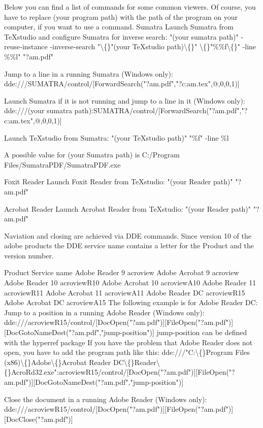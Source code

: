 \documentclass{article}
\begin{document}
	Below you can find a list of commands for some common viewers. Of course, you have to replace (your program path) with the path of the program on your computer, if you want to use a command.
	Sumatra
	Launch Sumatra from TeXstudio and configure Sumatra for inverse search: "(your sumatra path)" -reuse-instance -inverse-search "\textbackslash\{\}"(your TeXstudio path)\textbackslash\{\}" \textbackslash\{\}"\%\%f\textbackslash\{\}" -line \%\%l" "?am.pdf"
	
	Jump to a line in a running Sumatra (Windows only): dde:///SUMATRA/control/[ForwardSearch("?am.pdf","?c:am.tex",@,0,0,1)]
	
	Launch Sumatra if it is not running and jump to a line in it (Windows only): dde:///(your sumatra path):SUMATRA/control/[ForwardSearch("?am.pdf","?c:am.tex",@,0,0,1)]
	
	Launch TeXstudio from Sumatra: "(your TeXstudio path)" "\%f" -line \%l
	
	A possible value for (your Sumatra path) is C:/Program Files/SumatraPDF/SumatraPDF.exe
	
	Foxit Reader
	Launch Foxit Reader from TeXstudio: "(your Reader path)" "?am.pdf"
	
	Acrobat Reader
	Launch Acrobat Reader from TeXstudio: "(your Reader path)" "?am.pdf"
	
	Naviation and closing are achieved via DDE commands. Since version 10 of the adobe products the DDE service name contains a letter for the Product and the version number.
	
	Product	Service name
	Adobe Reader 9	acroview
	Adobe Acrobat 9	acroview
	Adobe Reader 10	acroviewR10
	Adobe Acrobat 10	acroviewA10
	Adobe Reader 11	acroviewR11
	Adobe Acrobat 11	acroviewA11
	Adobe Reader DC	acroviewR15
	Adobe Acrobat DC	acroviewA15
	The following example is for Adobe Reader DC:
	Jump to a position in a running Adobe Reader (Windows only): dde:///acroviewR15/control/[DocOpen("?am.pdf")][FileOpen("?am.pdf")][DocGotoNameDest("?am.pdf","jump-position")]         jump-position can be defined with the hyperref package
	If you have the problem that Adobe Reader does not open, you have to add the program path like this: dde:///"C:\textbackslash\{\}Program Files (x86)\textbackslash\{\}Adobe\textbackslash\{\}Acrobat Reader DC\textbackslash\{\}Reader\textbackslash\{\}AcroRd32.exe":acroviewR15/control/[DocOpen("?am.pdf")][FileOpen("?am.pdf")][DocGotoNameDest("?am.pdf","jump-position")]
	
	Close the document in a running Adobe Reader (Windows only): dde:///acroviewR15/control/[DocOpen("?am.pdf")][FileOpen("?am.pdf")][DocClose("?am.pdf")]
	
\end{document}
